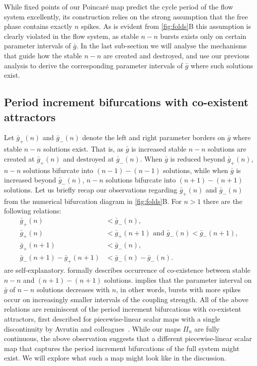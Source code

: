 \documentclass[utf8]{frontiersFPHY} %
\newcommand{\gbar}{\bar g}
\begin{document}
While fixed points of our Poincaré map predict the cycle period of the flow system excellently, its construction relies on the strong assumption that the free phase contains exactly $n$ spikes.
As is evident from \cref{fig:folds}B this assumption is clearly violated in the flow system, as stable $n-n$ bursts exists only on certain parameter intervals of $\gbar$.
In the last sub-section we will analyse the mechanisms that guide how the stable $n-n$ are created and destroyed, and use our previous analysis to derive the corresponding parameter intervals of $\gbar$ where such solutions exist.

\subsection{Period increment bifurcations with co-existent attractors}
Let $\gbar_+(n)$ and $\gbar_-(n)$ denote the left and right parameter borders on $\gbar$ where stable $n-n$ solutions exist.
That is, as $\gbar$ is increased stable $n-n$ solutions are created at $\gbar_+(n)$ and destroyed at $\gbar_-(n)$.
When $\gbar$ is reduced beyond $\gbar_+(n)$, $n-n$ solutions bifurcate into $(n-1)-(n-1)$ solutions, while when $\gbar$ is increased beyond $\gbar_-(n)$, $n-n$ solutions bifurcate into $(n+1)-(n+1)$ solutions.
Let us briefly recap our observations regarding $\gbar_+(n)$ and $\gbar_-(n)$ from the numerical bifurcation diagram in \cref{fig:folds}B.
For $n>1$ there are the following relations:
\begin{align}
  \gbar_+(n) &< \gbar_-(n)\label{eq:easy1},\\
  \gbar_+(n) &< \gbar_+(n+1)\text{ and } \gbar_-(n)<\gbar_-(n+1)\label{eq:easy2},\\
  \gbar_+(n+1) &< \gbar_-(n)\label{eq:coexistence},\\
  \gbar_-(n+1) - \gbar_+(n+1) &< \gbar_-(n) - \gbar_-(n)\label{eq:robustness}.
\end{align}
 are self-explanatory.
 formally describes occurrence of co-existence between stable $n-n$ and $(n+1)-(n+1)$ solutions.
 implies that the parameter interval on $\gbar$ of $n-n$ solutions decreases with $n$, in other words, bursts with more spikes occur on increasingly smaller intervals of the coupling strength.
All of the above relations are reminiscent of the period increment bifurcations with co-existent attractors, first described for piecewise-linear scalar maps with a single discontinuity by Avrutin and colleagues~\cite[e.g. see][]{gardini2012,tramontana2012,avrutin2011,gardini2012}.
While our maps $\Pi_n$ are fully continuous, the above observation suggests that
a different piecewise-linear scalar map that captures the period increment bifurcations of the full system might exist.
We will explore what such a map might look like in the discussion.
\end{document}
